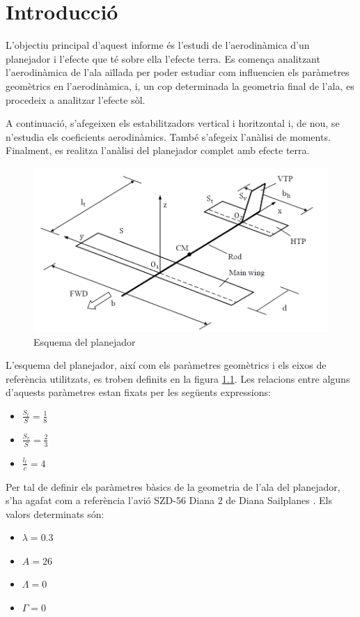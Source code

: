 \chapter{Introducció}

L'objectiu principal d'aquest informe és l'estudi de l'aerodinàmica d'un planejador i l'efecte que té sobre ella l'efecte terra.
Es comença analitzant l'aerodinàmica de l'ala aïllada per poder estudiar com influencien els paràmetres geomètrics en l'aerodinàmica, i, un cop determinada la geometria final de l'ala, es procedeix a analitzar l'efecte sòl.

A continuació, s'afegeixen els estabilitzadors vertical i horitzontal i, de nou, se n'estudia els coeficients aerodinàmics. També s'afegeix l'anàlisi de moments. Finalment, es realitza l'anàlisi del planejador complet amb efecte terra.

\begin{figure}[h]
	\centering
	\includegraphics[scale=0.5]{plots/enunciat.png}
	\caption{Esquema del planejador}
	\label{enunciat}
\end{figure}

L'esquema del planejador, així com els paràmetres geomètrics i els eixos de referència utilitzats, es troben definits en la figura \ref{enunciat}. Les relacions entre alguns d'aquests paràmetres estan fixats per les següents expressions:
\begin{itemize}
	\item $\frac{S_{t}}{S}=\frac{1}{8}$
	\item $\frac{S_{v}}{S}=\frac{2}{3}$
	\item $\frac{l_{t}}{\bar{c}}=4$
\end{itemize}

Per tal de definir els paràmetres bàsics de la geometria de l'ala del planejador, s'ha agafat com a referència l'avió SZD-56 Diana 2 de Diana Sailplanes \cite{Kubrynski2006}. Els valors determinats són:
\begin{itemize}
	\item $\lambda=0.3$
	\item $A=26$
	\item $\Lambda=0$
	\item $\Gamma=0$
\end{itemize}
